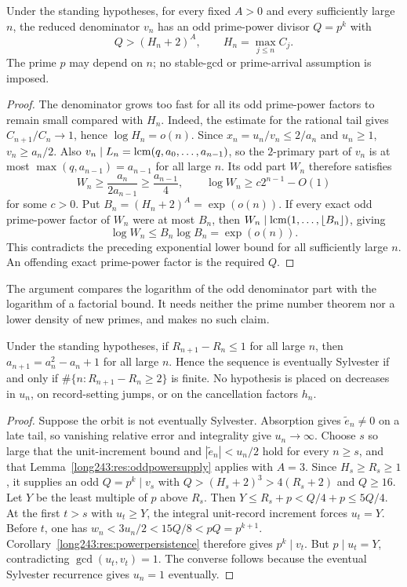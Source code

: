 \documentclass[11pt]{article}
\begin{document}
\begin{lemma}\label{long243:res:oddpowersupply}
Under the standing hypotheses, for every fixed $A>0$ and every sufficiently large $n$, the
reduced denominator $v_n$ has an odd prime-power divisor $Q=p^k$ with
\[
 Q>(H_n+2)^A,\qquad H_n=\max_{j\le n}C_j.
\]
The prime $p$ may depend on $n$; no stable-gcd or prime-arrival assumption
is imposed.
\end{lemma}
\begin{proof}
The denominator grows too fast for all its odd prime-power factors to
remain small compared with $H_n$. Indeed, the estimate for the rational
tail gives $C_{n+1}/C_n\to1$, hence $\log H_n=o(n)$. Since $x_n=u_n/v_n\le2/a_n$ and $u_n\ge1$,
$v_n\ge a_n/2$. Also $v_n\mid L_n=\operatorname{lcm}(q,a_0,\ldots,a_{n-1})$,
so the $2$-primary part of $v_n$ is at most $\max(q,a_{n-1})=a_{n-1}$
for all large $n$. Its odd part $W_n$ therefore satisfies
\[
 W_n\ge\frac{a_n}{2a_{n-1}}\ge\frac{a_{n-1}}4,
 \qquad \log W_n\ge c2^{n-1}-O(1)
\]
for some $c>0$.
Put $B_n=(H_n+2)^A=\exp(o(n))$. If every exact odd prime-power factor of
$W_n$ were at most $B_n$, then
$W_n\mid\operatorname{lcm}(1,\ldots,\lfloor B_n\rfloor)$, giving
\[
 \log W_n\le B_n\log B_n=\exp(o(n)).
\]
This contradicts the preceding exponential lower bound for all sufficiently
large $n$. An offending exact prime-power factor is the required $Q$.
\end{proof}
The argument compares the logarithm of the odd denominator part with the
logarithm of a factorial bound. It needs neither the prime number theorem
nor a lower density of new primes, and makes no such claim.

\begin{theorem}\label{long243:res:unitrecord}
Under the standing hypotheses, if $R_{n+1}-R_n\le1$ for all large $n$, then $a_{n+1}=a_n^2-a_n+1$
for all large $n$.  Hence the sequence is eventually Sylvester if and only if
$\#\{n:R_{n+1}-R_n\ge2\}$ is finite.  No hypothesis is placed on decreases in $u_n$, on
record-setting jumps, or on the cancellation factors $h_n$.
\end{theorem}

\begin{proof}
Suppose the orbit is not eventually Sylvester. Absorption gives
$\tilde e_n\ne0$ on a late tail, so vanishing relative error and integrality give
$u_n\to\infty$. Choose $s$ so large that the unit-increment bound and
$|\tilde e_n|<u_n/2$ hold for every $n\ge s$, and that
Lemma~\ref{long243:res:oddpowersupply} applies with $A=3$.
Since $H_s\ge R_s\ge1$, it supplies an odd $Q=p^k\mid v_s$ with
$Q>(H_s+2)^3>4(R_s+2)$ and $Q\ge16$.
Let $Y$ be the least multiple of $p$ above $R_s$. Then
$Y\le R_s+p< Q/4+p\le5Q/4$.
At the first $t>s$ with $u_t\ge Y$, the integral unit-record increment
forces $u_t=Y$. Before $t$, one has
$w_n<3u_n/2<15Q/8<pQ=p^{k+1}$.
Corollary~\ref{long243:res:powerpersistence} therefore gives $p^k\mid v_t$.
But $p\mid u_t=Y$, contradicting $\gcd(u_t,v_t)=1$.
The converse follows because the eventual Sylvester recurrence gives $u_n=1$ eventually.
\end{proof}
\end{document}
